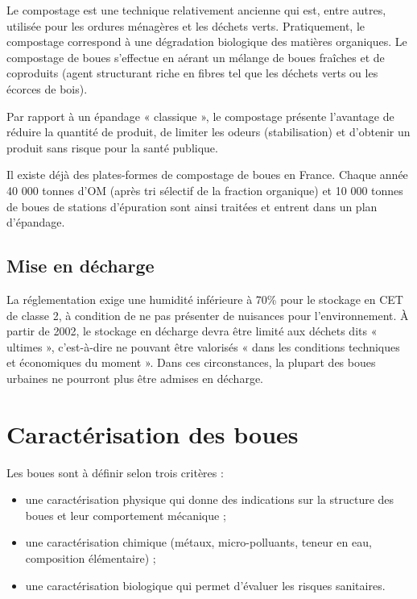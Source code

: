 Le compostage est une technique relativement ancienne qui est, entre autres, utilisée pour les ordures ménagères et les déchets verts. Pratiquement, le compostage correspond à une dégradation biologique des matières organiques. Le compostage de boues s’effectue en aérant un mélange de boues fraîches et de coproduits (agent structurant riche en fibres tel que les déchets verts ou les écorces de bois).
\vspace{0.3cm}

Par rapport à un épandage « classique », le compostage présente l’avantage de réduire la quantité de produit, de limiter les odeurs (stabilisation) et d’obtenir un produit sans risque pour la santé publique.
\vspace{0.3cm}

Il existe déjà des plates-formes de compostage de boues en France. Chaque année 40 000 tonnes d’OM (après tri sélectif de la fraction organique) et 10 000 tonnes de boues de stations d’épuration sont ainsi traitées et entrent dans un plan d’épandage. 


\subsection{Mise en décharge}

La réglementation exige une humidité inférieure à 70\% pour le stockage en CET de classe 2, à condition de ne pas présenter de nuisances pour l’environnement.
À partir de 2002, le stockage en décharge devra être limité aux déchets dits « ultimes », c’est-à-dire ne pouvant être valorisés « dans les conditions techniques et économiques du moment ». Dans ces circonstances, la plupart des boues urbaines ne pourront plus être admises en décharge. 


\section{Caractérisation des boues}

Les boues sont à définir selon trois critères : 

\begin{itemize}
\item une caractérisation physique qui donne des indications sur la structure des boues et leur comportement mécanique ;
\item  une caractérisation chimique (métaux, micro-polluants, teneur en eau, composition élémentaire) ;
\item  une caractérisation biologique qui permet d’évaluer les risques sanitaires.
\end{itemize}

